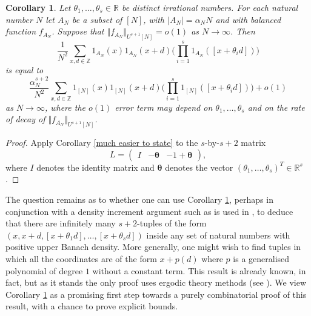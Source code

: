 \documentclass[12pt,a4paper,twoside,reqno]{amsart}
\newtheorem{Corollary}[Theorem]{Corollary}
\numberwithin{equation}{section}
\begin{document}
\begin{Corollary}
\label{Corollary irrational szem}
Let $\theta_1,\dots,\theta _s \in \mathbb{R}$ be distinct irrational numbers. For each natural number $N$ let $A_N$ be a subset of $[N]$, with $\vert A_N\vert = \alpha_N N$ and with balanced function $f_{A_N}$. Suppose that $\Vert f_{A_N}\Vert_{U^{s+1}[N]} = o(1)$ as $N\rightarrow \infty$. Then 
\begin{equation}
\label{particular patterns}
\frac{1}{N^2} \sum\limits_{x,d \in \mathbb{Z}} 1_{A_N}(x) 1_{A_N}(x+d)\Big (\prod\limits_{i=1}^s 1_{A_N}([x + \theta_i d]) \Big )\end{equation}\noindent is equal to
\begin{equation*}
\frac{\alpha_N^{s+2}}{N^2} \sum\limits_{x,d \in \mathbb{Z}} 1_{[N]}(x) 1_{[N]}(x+d)\Big (\prod\limits_{i=1}^s 1_{[N]}([x + \theta_i d]) \Big ) + o(1)
\end{equation*}
\noindent as $N\rightarrow \infty$, where the $o(1)$ error term may depend on $\theta_1,\dots,\theta_s$ and on the rate of decay of $\Vert f_{A_N}\Vert_{U^{s+1}[N]}$. 
\end{Corollary}
\begin{proof}
Apply Corollary \ref{much easier to state} to the $s$-by-$s+2$ matrix 
\begin{equation}
\label{general irrational L}
L = \left( \begin{matrix} I & -\boldsymbol{\theta} & -1 + \boldsymbol{\theta} \end{matrix} \right),
\end{equation} where $I$ denotes the identity matrix and $\boldsymbol{\theta}$ denotes the vector $(\theta_1,\dots,\theta_s)^T \in \mathbb{R}^{s}$. 
\end{proof}

The question remains as to whether one can use Corollary \ref{Corollary irrational szem}, perhaps in conjunction with a density increment argument such as is used in \cite{GT10a}, to deduce that there are infinitely many $s+2$-tuples of the form $(x,x+d,[x + \theta_1 d],\dots,[ x + \theta_s d ])$ inside any set of natural numbers with positive upper Banach density. More generally, one might wish to find tuples in which all the coordinates are of the form $x + p(d)$ where $p$ is a generalised polynomial of degree $1$ without a constant term. This result is already known, in fact, but as it stands the only proof uses ergodic theory methods (see \cite[Theorem B]{McC05}). We view Corollary \ref{Corollary irrational szem} as a promising first step towards a purely combinatorial proof of this result, with a chance to prove explicit bounds.\\
\end{document}
